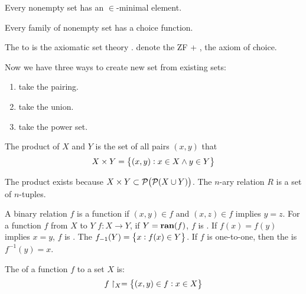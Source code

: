 \begin{axiom}\label{axiomofregularation}
    Every nonempty set has an $\in$-minimal element.
\end{axiom}

\begin{axiom}\label{axiomofchoice}
    Every family of nonempty set has a choice function.
\end{axiom}

The  to  is the  axiomatic set theory .  denote the ZF + , the axiom of choice.

Now we have three ways to create new set from existing sets:
\begin{enumerate}
    \item take the pairing.
    \item take the union.
    \item take the power set.
\end{enumerate}

\begin{definition}
    The product of $X$ and $Y$ is the set of all pairs $(x,y)$ that 
    \begin{equation}
        X \times Y = \set{(x,y): x \in X \wedge y \in Y }
    \end{equation}
    
    The product exists because $X \times Y \subset \powerset{ \powerset{X \cup Y}}$. The $n$-ary relation $R$ is a set of $n$-tuples.
\end{definition}

\begin{definition}
    A binary relation $f$ is a function if $(x,y) \in f$ and $(x, z) \in f$ implies $y = z$. For a function $f$ from $X$ to $Y$ $f : X \rightarrow Y$, if $Y = \mathbf{ran}(f)$, $f$ is . If $f(x) = f(y)$ implies $x=y$, $f$ is . The  $f_{-1} (Y) = \set{x: f(x) \in Y}$. If $f$ is one-to-one, then the  is $f^{-1} (y) = x$.
\end{definition}

\begin{definition}
    The  of a function $f$ to a set $X$ is:
    \begin{equation}
        f\restriction_X = \set{(x,y) \in f : x \in X}
    \end{equation}
\end{definition}



